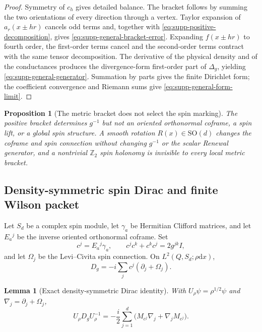 \documentclass[11pt]{article}
\newtheorem{proposition}[proposition]{Proposition}
\newtheorem{lemma}[lemma]{Lemma}
\theoremstyle{definition}
\theoremstyle{remark}
\theoremstyle{definition}
\theoremstyle{remark}
\newcommand{\dd}{\mathrm d}
\begin{document}
\begin{proof}
Symmetry of $c_h$ gives detailed balance.  The bracket follows by summing the two
orientations of every direction through a vertex.  Taylor expansion of
$a_r(x\pm hr)$ cancels odd terms and, together with
\eqref{eq:supp-positive-decomposition}, gives
\eqref{eq:supp-general-bracket-error}.  Expanding
$f(x\pm hr)$ to fourth order, the first-order terms cancel and the second-order
terms contract with the same tensor decomposition.  The derivative of the physical
density and of the conductances produces the divergence-form first-order part of
$\Delta_g$, yielding \eqref{eq:supp-general-generator}.  Summation by parts gives
the finite Dirichlet form; the coefficient convergence and Riemann sums give
\eqref{eq:supp-general-form-limit}.
\end{proof}

\begin{proposition}[The metric bracket does not select the spin marking]
\label{cth:supp-metric-no-coframe}
The positive bracket determines $g^{-1}$ but not an oriented orthonormal coframe, a
spin lift, or a global spin structure.  A smooth rotation
$R(x)\in\mathrm{SO}(d)$ changes the coframe and spin connection without changing
$g^{-1}$ or the scalar Renewal generator, and a nontrivial $\mathbb Z_2$ spin
holonomy is invisible to every local metric bracket.
\end{proposition}

\subsection{Density-symmetric spin Dirac and finite Wilson packet}

Let $S_d$ be a complex spin module, let $\gamma_a$ be Hermitian Clifford matrices,
and let $E_a{}^j$ be the inverse oriented orthonormal coframe.  Set
\begin{equation}
c^j=E_a{}^j\gamma_a,
\qquad
c^jc^k+c^kc^j=2g^{jk}I,
\label{eq:supp-clifford-coeff}
\end{equation}
and let $\Omega_j$ be the Levi--Civita spin connection.  On
$L^2(Q,S_d;\rho\dd x)$,
\begin{equation}
D_g=-i\sum_jc^j(\partial_j+\Omega_j).
\label{eq:supp-geometric-dirac}
\end{equation}

\begin{lemma}[Exact density-symmetric Dirac identity]
\label{lem:supp-density-symmetric}
With $U_\rho\psi=\rho^{1/2}\psi$ and
$\nabla_j=\partial_j+\Omega_j$,
\begin{equation}
{
U_\rho D_gU_\rho^{-1}
=-\frac{i}{2}\sum_{j=1}^d
\bigl(M_{c^j}\nabla_j+\nabla_jM_{c^j}\bigr).}
\label{eq:supp-density-symmetric}
\end{equation}
\end{lemma}
\end{document}
